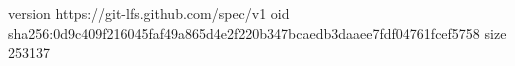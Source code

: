 version https://git-lfs.github.com/spec/v1
oid sha256:0d9c409f216045faf49a865d4e2f220b347bcaedb3daaee7fdf04761fcef5758
size 253137
